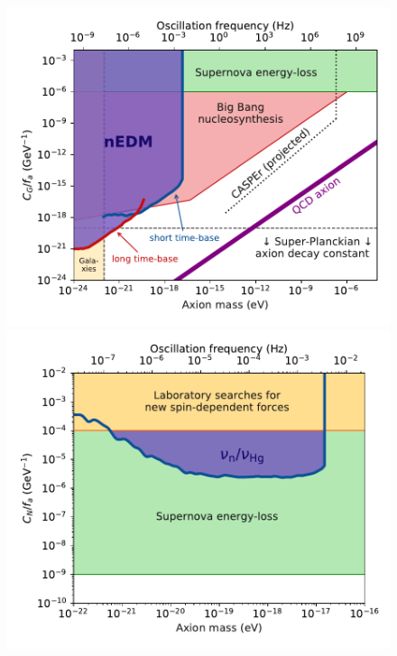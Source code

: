 \begin{figure}
  \centering
  \includegraphics[width=\columnwidth]{gfx/axions/psi_ill_axion_limits_v7.pdf}
  \includegraphics[width=\columnwidth]{gfx/axions/psi_ill_axion_wind_limits_v1.pdf}
  \caption{
}
\end{figure}
